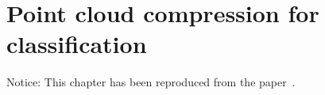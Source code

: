 \chapter{Point cloud compression for classification}
\label{ch:point_cloud_compression}

\begingroup

\setlength\aboverulesep{0.3827ex+0.1\normalbaselineskip}
\setlength\belowrulesep{0.6219ex+0.1\normalbaselineskip}


\begin{center}
  \small
  Notice: This chapter has been reproduced from the paper~\cite{ulhaq2023pointcloud}.
\end{center}




%
%
%


